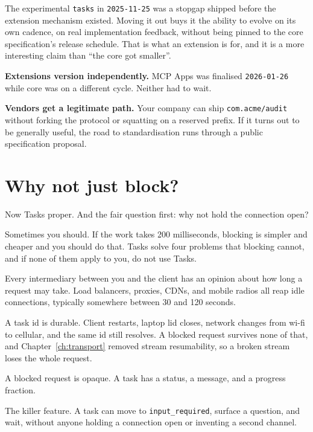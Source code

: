 The experimental \texttt{tasks} in \texttt{2025-11-25} was a stopgap shipped
before the extension mechanism existed. Moving it out buys it the ability to
evolve on its own cadence, on real implementation feedback, without being pinned
to the core specification's release schedule. That is what an extension is for,
and it is a more interesting claim than ``the core got smaller''.

\textbf{Extensions version independently.} MCP Apps was finalised
\texttt{2026-01-26} while core was on a different cycle. Neither had to wait.

\textbf{Vendors get a legitimate path.} Your company can ship
\texttt{com.acme/audit} without forking the protocol or squatting on a reserved
prefix. If it turns out to be generally useful, the road to standardisation runs through a public specification proposal.

\section{Why not just block?}

Now Tasks proper. And the fair question first: why not hold the connection open?

Sometimes you should. If the work takes 200 milliseconds, blocking is simpler
and cheaper and you should do that. Tasks solve four problems that blocking
cannot, and if none of them apply to you, do not use Tasks.

\begin{description}[leftmargin=1.4em, style=nextline, itemsep=3pt]
\item[Timeouts you do not control] Every intermediary between you and the client
has an opinion about how long a request may take. Load balancers, proxies, CDNs,
and mobile radios all reap idle connections, typically somewhere between 30 and
120 seconds.
\item[Crash resilience] A task id is durable. Client restarts, laptop lid
closes, network changes from wi-fi to cellular, and the same id still resolves.
A blocked request survives none of that, and Chapter~\ref{ch:transport} removed
stream resumability, so a broken stream loses the whole request.
\item[Progress visibility] A blocked request is opaque. A task has a status, a
message, and a progress fraction.
\item[Mid-flight input] The killer feature. A task can move to
\texttt{input\_required}, surface a question, and wait, without anyone holding a
connection open or inventing a second channel.
\end{description}

